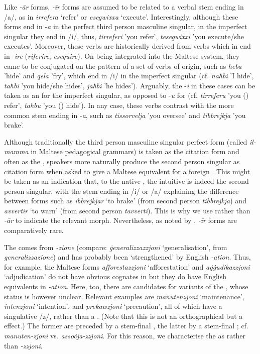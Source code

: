 \documentclass[output=paper]{LSP/langsci}
\begin{document}
Like \textit{-ār} forms, \textit{-īr} forms are assumed to be related to a verbal stem ending in /a/, as in \textit{irrefera} `refer' or \textit{esegwixxa} `execute'. Interestingly, although these forms end in -\textit{a} in the perfect third person masculine singular, in the imperfect singular they end in /i/, thus, \textit{tirreferi} 'you refer', \textit{tesegwixxi} 'you execute/she executes'. Moreover, these verbs are historically derived from verbs which in  end in -\textit{ire} (\textit{riferire}, \textit{eseguire}). On being integrated into the Maltese  system, they came to be conjugated on the pattern of a set of verbs of  origin, such as \textit{ħeba} 'hide' and \textit{qela} 'fry', which end in /i/ in the imperfect singular (cf. \textit{naħbi} 'I hide', \textit{taħbi} 'you hide/she hides', \textit{jaħbi} 'he hides'). Arguably, the -\textit{i} in these cases can be taken as an   for the imperfect singular, as opposed to -\textit{u} for  (cf. \textit{tirreferu} 'you () refer', \textit{taħbu} 'you () hide'). In any case, these verbs contrast with the more common stem ending in -\textit{a}, such as \textit{tissorvelja} 'you oversee' and \textit{tibbrejkja} 'you brake'.

Although traditionally the third person masculine singular perfect form (called \textit{il-mamma} in Maltese pedagogical grammars) is taken as the citation form and often as the , speakers more naturally produce the second person singular as citation form when asked to give a Maltese equivalent for a foreign . 
This might be taken as an indication that, to the native , the intuitive  is indeed the second person singular, with the stem ending in /i/ or /a/ explaining the difference between forms such as \textit{ibbrejkjar} `to brake' (from second person \textit{tibbrejkja}) and \textit{avvertir} `to warn' (from second person \textit{tavverti}). This is why we use {\ar} rather than \textit{-ār} to indicate the relevant morph. Nevertheless, as noted by \citet{Camilleri1993}, \textit{-īr} forms are comparatively rare.

The  {\zjoni} comes from  \textit{-zione} (compare: \textit{ġeneralizzazzjoni} `generalisation', from  \textit{generalizzazione}) and has probably been `strengthened' by English \textit{-ation}. Thus, for example, the Maltese forms \textit{afforestazzjoni} `afforestation' and \textit{aġġudikazzjoni} `adjudication' do not have obvious cognates in  but they do have English equivalents in \textit{-ation}. Here, too, there are candidates for  variants of the , whose status is however unclear. Relevant examples are \textit{manutenzjoni} `maintenance', \textit{intenzjoni} `intention', and \textit{prekawzjoni} `precaution', all of which have a singulative /z/, rather than a . (Note that this is not an orthographical but a  effect.) The former are preceded by a stem-final , the latter by a stem-final ; cf. \textit{manuten-zjoni} vs. \textit{assoċja-zzjoni}. For this reason, we characterise the  as {\zjoni} rather than \textit{-zzjoni}.
\end{document}
